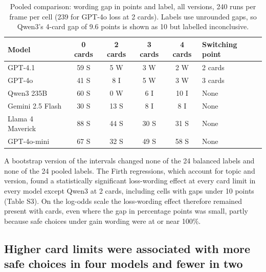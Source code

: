 \documentclass[11pt]{article}
\begin{document}
\begin{table}[ht]
\centering
\footnotesize
\caption{Pooled comparison: wording gap in points and label, all versions, 240 runs per frame per cell (239 for GPT-4o loss at 2 cards). Labels use unrounded gaps, so Qwen3's 4-card gap of 9.6 points is shown as 10 but labelled inconclusive.}
\label{tab:3}
\setlength{\tabcolsep}{4pt}
\begin{tabular}{lccccl}
\toprule
Model & 0 cards & 2 cards & 3 cards & 4 cards & Switching point \\
\midrule
GPT-4.1 & 59 S & 5 W & 3 W & 2 W & 2 cards \\
GPT-4o & 41 S & 8 I & 5 W & 3 W & 3 cards \\
Qwen3 235B & 60 S & 0 W & 6 I & 10 I & None \\
Gemini 2.5 Flash & 30 S & 13 S & 8 I & 8 I & None \\
Llama 4 Maverick & 88 S & 44 S & 30 S & 31 S & None \\
GPT-4o-mini & 67 S & 32 S & 49 S & 58 S & None \\
\bottomrule
\end{tabular}
\end{table}

A bootstrap version of the intervals changed none of the 24 balanced labels and none of the 24 pooled labels. The Firth regressions, which account for topic and version, found a statistically significant loss-wording effect at every card limit in every model except Qwen3 at 2 cards, including cells with gaps under 10 points (Table S3). On the log-odds scale the loss-wording effect therefore remained present with cards, even where the gap in percentage points was small, partly because safe choices under gain wording were at or near 100\%.

\subsection{Higher card limits were associated with more safe choices in four models and fewer in two}
\end{document}
